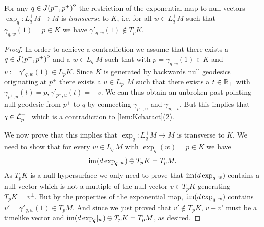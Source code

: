 
\begin{lemma}\label{lem:transversality}
For any $q\in {\kern0ptJ(p^-,p^+)}^{\mathrm{o}}$ the restriction of the exponential map to null vectors $\exp_q:L^+_qM\to M$ is \emph{transverse} to $K$, i.e. for all $w\in L^+_qM$ such that $\gamma_{q,w}(1) = p\in K$ we have $\gamma'_{q,w}(1)\notin T_pK$.
\end{lemma}
\begin{proof}
    In order to achieve a contradiction we assume that there exists a $q\in {\kern0ptJ(p^-,p^+)}^{\mathrm{o}}$ and a $w\in L^+_qM$ such that with $p=\gamma_{q,w}(1)\in K$ and $v:=\gamma'_{q,w}(1)\in L_pK$.
    Since $K$ is generated by backwards null geodesics originating at $p^+$ there exists a $u\in L^-_{p^+}M$ such that there exists a $t\in \mathbb{R}_+$ with $\gamma_{p^+,u}(t)=p, \gamma'_{p^+,u}(t)=-v$. We can thus obtain an unbroken past-pointing null geodesic from $p^+$ to $q$ by connecting $\gamma_{p^+,u}$ and $\gamma_{p,-v}$. But this implies that $q\in {\mathcal{L}}^-_{p^+}$ which is a contradiction to \ref{lem:Kcharact}(2).

    We now prove that this implies that $\exp_q:L^+_qM\to M$ is transverse to $K$. We need to show that for every $w\in L^+_qM$ with $\exp_q(w)=p\in K$ we have 
    \[
        \operatorname{im}(d\exp_q\rvert_w) \oplus T_pK = T_pM.
    \]
    As $T_pK$ is a null hypersurface we only need to prove that $\operatorname{im}(d\exp_q\rvert_w)$ contains a null vector which is not a multiple of the null vector $v\in T_pK$ generating $T_pK = v^\perp$. But by the properties of the exponential map, $\operatorname{im}(d\exp_q\rvert_w)$ contains $v' = \gamma'_{q,w}(1) \in T_pM$. And since we just proved that $v'\notin T_pK$, $v+v'$ must be a timelike vector and $\operatorname{im}(d\exp_q\rvert_w) \oplus T_pK = T_pM$, as desired.
\end{proof}

